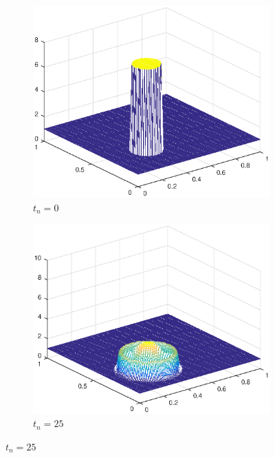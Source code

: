 \begin{figure}[h!]
    \centering
    \begin{subfigure}[t]{0.4\textwidth}
        \centering
        \includegraphics[width=\textwidth]{images/sol_ri_0000.eps}
        \caption{$t_{n}=0$}
        \label{fig:0}
    \end{subfigure}
    \begin{subfigure}[t]{0.48\textwidth}
        \centering
        \includegraphics[width=\textwidth]{images/sol_ri_0025.eps}
        \caption{$t_{n}=25$}
        \label{fig:10}
    \end{subfigure}

\end{figure}
